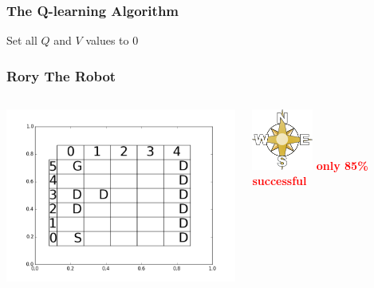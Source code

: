 \documentclass{beamer}
\begin{document}
\begin{frame}
	\frametitle{The Q-learning Algorithm}
\begin{center}
\begin{algorithm}[H]
	\DontPrintSemicolon
	Set all $Q$ and $V$ values to 0\;
  \end{algorithm}
  \end{center}
\end{frame}


\begin{frame}
	\frametitle{Rory The Robot}
  \begin{columns}[c]
	     \includegraphics[width=8.5cm]{Images/boardrory}
	     \begin{center}
		   \includegraphics[width=2cm]{Images/compass} \newline \newline \newline
		   \pause
		   \huge{\textbf{\textcolor{red}{only 85\% successful}}}
	     \end{center}
  \end{columns}
\end{frame}
\end{document}

